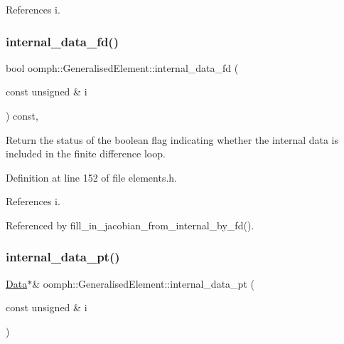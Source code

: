 References i.

\mbox{\label{classoomph_1_1GeneralisedElement_a267f0eb0e548ea9b4908d1076370ba95}} 
\subsubsection{\texorpdfstring{internal\+\_\+data\+\_\+fd()}{internal\_data\_fd()}}
{\footnotesize\ttfamily bool oomph\+::\+Generalised\+Element\+::internal\+\_\+data\+\_\+fd (\begin{DoxyParamCaption}\item[{const unsigned \&}]{i }\end{DoxyParamCaption}) const\hspace{0.3cm}{\ttfamily [inline]}, {\ttfamily [protected]}}



Return the status of the boolean flag indicating whether the internal data is included in the finite difference loop. 



Definition at line 152 of file elements.\+h.



References i.



Referenced by fill\+\_\+in\+\_\+jacobian\+\_\+from\+\_\+internal\+\_\+by\+\_\+fd().

\mbox{\label{classoomph_1_1GeneralisedElement_a45e32d895d4b3686e0f15fe455f4ed44}} 
\subsubsection{\texorpdfstring{internal\+\_\+data\+\_\+pt()}{internal\_data\_pt()}\hspace{0.1cm}{\footnotesize\ttfamily [1/2]}}
{\footnotesize\ttfamily \hyperlink{classoomph_1_1Data}{Data}$\ast$\& oomph\+::\+Generalised\+Element\+::internal\+\_\+data\+\_\+pt (\begin{DoxyParamCaption}\item[{const unsigned \&}]{i }\end{DoxyParamCaption})\hspace{0.3cm}{\ttfamily [inline]}}



